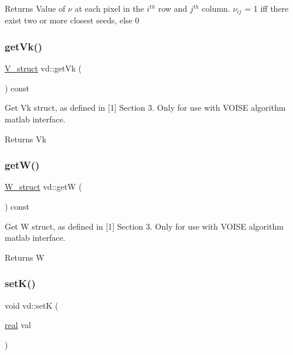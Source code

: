 \begin{DoxyReturn}{Returns}
Value of $\nu$ at each pixel in the $ i^{th} $ row and $ j^{th} $ column. $\nu_{ij}$ = 1 iff there exist two or more closest seeds, else 0 
\end{DoxyReturn}
\mbox{\label{classvd_a090bebdbbff36888934c870daf3dcb36}} 
\subsubsection{\texorpdfstring{get\+Vk()}{getVk()}}
{\footnotesize\ttfamily \mbox{\hyperlink{structV__struct}{V\+\_\+struct}} vd\+::get\+Vk (\begin{DoxyParamCaption}{ }\end{DoxyParamCaption}) const}



Get Vk struct, as defined in \mbox{[}1\mbox{]} Section 3. Only for use with V\+O\+I\+SE algorithm matlab interface. 

\begin{DoxyReturn}{Returns}
Vk 
\end{DoxyReturn}
\mbox{\label{classvd_ab4d0d9ea76cedf1a6825b62c9ec2d118}} 
\subsubsection{\texorpdfstring{get\+W()}{getW()}}
{\footnotesize\ttfamily \mbox{\hyperlink{structW__struct}{W\+\_\+struct}} vd\+::getW (\begin{DoxyParamCaption}{ }\end{DoxyParamCaption}) const}



Get W struct, as defined in \mbox{[}1\mbox{]} Section 3. Only for use with V\+O\+I\+SE algorithm matlab interface. 

\begin{DoxyReturn}{Returns}
W 
\end{DoxyReturn}
\mbox{\label{classvd_a7c692a97b49c4596c4ec1bc0a129b516}} 
\subsubsection{\texorpdfstring{set\+K()}{setK()}}
{\footnotesize\ttfamily void vd\+::setK (\begin{DoxyParamCaption}\item[{\mbox{\hyperlink{typedefs_8h_a58a0c7cf2501f4492da833421be92547}{real}}}]{val }\end{DoxyParamCaption})}



